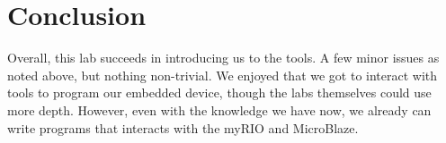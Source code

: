 \documentclass[10pt]{article}
\begin{document}
\section*{Conclusion}
    Overall, this lab succeeds in introducing us to the tools. A few minor issues as noted above, but nothing non-trivial. We enjoyed that we got to interact with tools to program our embedded device, though the labs themselves could use more depth. However, even with the knowledge we have now, we already can write programs that interacts with the myRIO and MicroBlaze.
\end{document}

